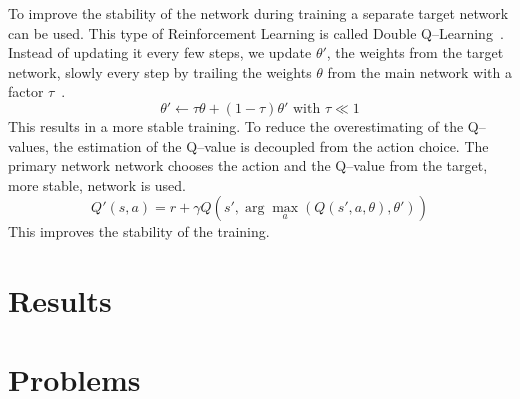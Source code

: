 To improve the stability of the network during training a separate target network can be used.
This type of Reinforcement Learning is called Double Q--Learning~\cite{HasseltGS15}.
Instead of updating it every few steps, we update $\theta'$, the weights from the target network, slowly every step by trailing the weights $\theta$ from the main network with a factor $\tau$~\cite{lillicrap2015continuous}.
\begin{equation}
	\theta' \leftarrow \tau\theta + (1-\tau)\theta' \text{ with } \tau \ll 1
\end{equation}
This results in a more stable training.
To reduce the overestimating of the Q--values, the estimation of the Q--value is decoupled from the action choice.
The primary network network chooses the action and the Q--value from the target, more stable, network is used.
\begin{equation}
	Q'(s, a) = r + \gamma Q(s', \arg\max_a(Q(s', a, \theta), \theta')) 
\end{equation}
This improves the stability of the training.

\section{Results}


\section{Problems}